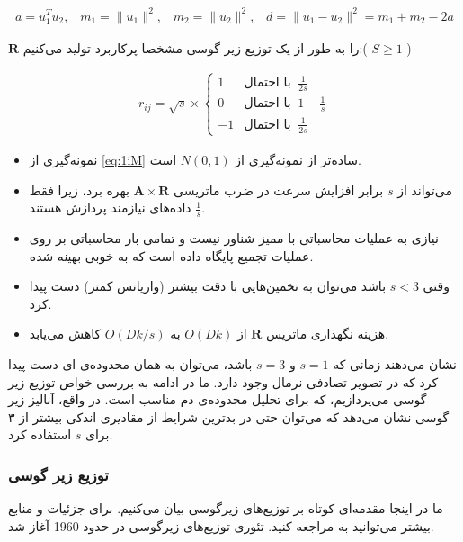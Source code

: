 \begin{align}
a = u_1^T u_2, \;\;\; m_1 = \| u_1 \|^2, \;\;\; m_2 = \| u_2 \|^2, \;\;\;
d = \| u_1 - u_2 \|^2 = m_1 + m_2 - 2a
\label{eq:1iL}
\end{align}

$\mathbf{R}$
را به طور 
از یک توزیع زیر گوسی مشخصا پرکاربرد تولید می‌کنیم:(
$S \geq 1$
)

\begin{align}
r_{ij} = \sqrt{s} \times 
\begin{cases}
1 & \text{با احتمال} \;\; \frac{1}{2s}\\
0 & \text{با احتمال} \;\; 
1-\frac{1}{s}\\
-1 & \text{با احتمال} \;\; \frac{1}{2s}
\end{cases} 
\label{eq:1iM}
\end{align}

\begin{itemize}
\item
نمونه‌گیری از 
\autoref{eq:1iM}
ساده‌تر از نمونه‌گیری از
$N(0,1)$
است.
\item
می‌تواند از 
$s$
برابر افزایش سرعت در ضرب ماتریسی 
$\mathbf{A} \times \mathbf{R}$
بهره برد، زیرا فقط
$\frac{1}{s}$
داده‌های نیازمند پردازش هستند.
\item
نیازی به عملیات محاسباتی با ممیز شناور نیست و تمامی بار محاسباتی بر روی عملیات تجمیع پایگاه داده است که به خوبی بهینه شده.
\item
وقتی 
$s<3$
باشد می‌توان به تخمین‌هایی با دقت بیشتر (واریانس کمتر) دست پیدا کرد.
\item
هزینه نگهداری ماتریس 
$\mathbf{R}$
از 
$O(Dk)$
به 
$O(Dk/s)$
کاهش می‌یابد.
\end{itemize}

\cite{litez2, litez3}
نشان ‌می‌دهند زمانی که 
$s=1$
و 
$s=3$
باشد، می‌توان به همان محدوده‌ی 
ای دست پیدا کرد که در تصویر تصادفی نرمال وجود دارد. ما در ادامه به بررسی خواص توزیع زیر گوسی می‌پردازیم، که برای تحلیل محدوده‌ی دم مناسب است. در واقع، آنالیز زیر گوسی نشان می‌دهد که می‌توان حتی در بدترین شرایط از مقادیری اندکی بیشتر از ۳ برای 
$s$
استفاده کرد.

\subsubsection{
توزیع زیر گوسی
}

ما در اینجا مقدمه‌ای کوتاه بر توزیع‌های زیرگوسی بیان می‌کنیم. برای جزئیات و منابع بیشتر می‌توانید به
\cite{litez40}
مراجعه کنید. تئوری توزیع‌های زیرگوسی در حدود 1960 آغاز شد.

